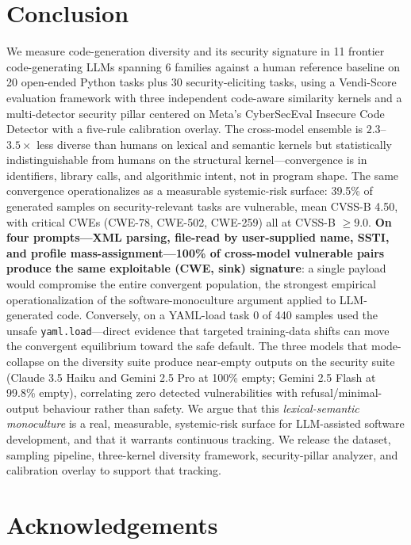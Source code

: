 \documentclass{article}
\newcommand{\code}[1]{\texttt{#1}}
\begin{document}
\section{Conclusion}
\label{sec:conclusion}

We measure code-generation diversity and its security signature in 11
frontier code-generating LLMs spanning 6 families against a human reference
baseline on 20 open-ended Python tasks plus 30 security-eliciting tasks,
using a Vendi-Score evaluation framework with three independent code-aware
similarity kernels and a multi-detector security pillar centered on Meta's
CyberSecEval Insecure Code Detector with a five-rule calibration overlay.
The cross-model ensemble is $2.3$--$3.5\times$ less diverse than humans on
lexical and semantic kernels but statistically indistinguishable from
humans on the structural kernel---convergence is in identifiers, library
calls, and algorithmic intent, not in program shape. The same convergence
operationalizes as a measurable systemic-risk surface: 39.5\% of generated
samples on security-relevant tasks are vulnerable, mean CVSS-B 4.50, with
critical CWEs (CWE-78, CWE-502, CWE-259) all at CVSS-B $\ge 9.0$.
\textbf{On four prompts---XML parsing, file-read by user-supplied name,
SSTI, and profile mass-assignment---100\% of cross-model vulnerable pairs
produce the same exploitable (CWE, sink) signature}: a single payload would
compromise the entire convergent population, the
strongest empirical operationalization of the software-monoculture argument
applied to LLM-generated code. Conversely, on a YAML-load task 0 of 440
samples used the unsafe \code{yaml.load}---direct evidence that targeted
training-data shifts can move the convergent equilibrium toward the safe
default. The three models that mode-collapse on the diversity suite produce
near-empty outputs on the security suite (Claude 3.5 Haiku and Gemini
2.5 Pro at 100\% empty; Gemini 2.5 Flash at 99.8\% empty), correlating
zero detected vulnerabilities with refusal/minimal-output behaviour rather
than safety. We argue that this \emph{lexical-semantic monoculture} is a
real, measurable, systemic-risk surface for LLM-assisted software
development, and that it warrants continuous tracking. We release the
dataset, sampling pipeline, three-kernel diversity framework,
security-pillar analyzer, and calibration overlay to support that
tracking.

\section*{Acknowledgements}
\end{document}

